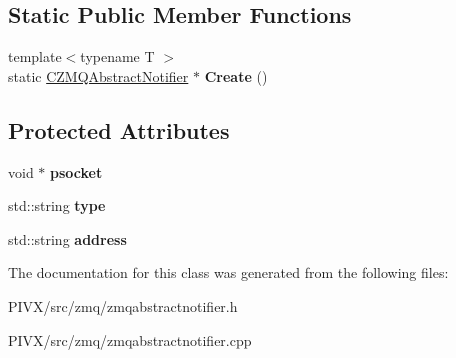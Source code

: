 \subsection*{Static Public Member Functions}
\begin{DoxyCompactItemize}
\item 
\mbox{\label{class_c_z_m_q_abstract_notifier_adf9df04ae4c55a55bcf7a9e85f30b481}} 
{\footnotesize template$<$typename T $>$ }\\static \mbox{\hyperlink{class_c_z_m_q_abstract_notifier}{C\+Z\+M\+Q\+Abstract\+Notifier}} $\ast$ {\bfseries Create} ()
\end{DoxyCompactItemize}
\subsection*{Protected Attributes}
\begin{DoxyCompactItemize}
\item 
\mbox{\label{class_c_z_m_q_abstract_notifier_a4cad2310e9e6d791ce27268881eb82cf}} 
void $\ast$ {\bfseries psocket}
\item 
\mbox{\label{class_c_z_m_q_abstract_notifier_a7e8bab88a7f858433cb3ba7f5ce3f793}} 
std\+::string {\bfseries type}
\item 
\mbox{\label{class_c_z_m_q_abstract_notifier_a7b316c5ca39f6a5e2297de163eb23d53}} 
std\+::string {\bfseries address}
\end{DoxyCompactItemize}


The documentation for this class was generated from the following files\+:\begin{DoxyCompactItemize}
\item 
P\+I\+V\+X/src/zmq/zmqabstractnotifier.\+h\item 
P\+I\+V\+X/src/zmq/zmqabstractnotifier.\+cpp\end{DoxyCompactItemize}
